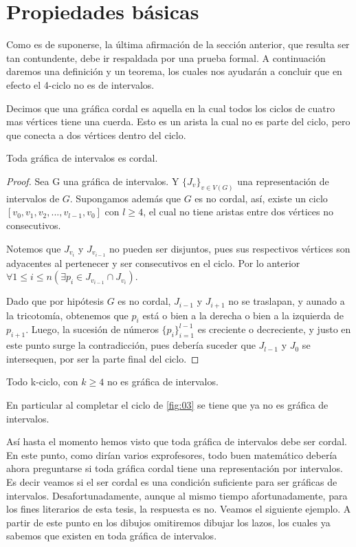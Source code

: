 \section{Propiedades b\'asicas}

Como es de suponerse, la última afirmación de la secci\'on anterior, que resulta ser tan contundente, debe ir respaldada por una prueba formal. 
A continuación daremos una definición y un teorema, los cuales nos ayudarán a concluir que en efecto el 4-ciclo no es de intervalos.

Decimos que una gráfica cordal es aquella en la cual todos los ciclos de cuatro mas vértices tiene una cuerda. Esto es un arista la cual no es parte del ciclo, pero que conecta a dos vértices dentro del ciclo.

\begin{teorema}
\label{teo:Int-Chord}
    Toda gráfica de intervalos es cordal.
\end{teorema}

\begin{proof}
    Sea G una gráfica de intervalos. Y $\{ J_v \}_{v \in V(G)}$ una representación de intervalos de $G$.
    Supongamos además que $G$ es no cordal, así, existe un ciclo $[v_0,v_1,v_2,...,v_{l-1},v_0]$ con $l \geq 4$, el cual no tiene aristas entre dos vértices no consecutivos.
    
    Notemos que $J_{v_i}$ y $J_{v_{i-1}}$ no pueden ser disjuntos, pues sus respectivos vértices son adyacentes al pertenecer y ser consecutivos en el ciclo. Por lo anterior $\forall 1 \leq i \leq n  (\exists p_i \in J_{v_{i-1}}\cap J_{v_i})$.
    
    Dado que por hipótesis $G$ es no cordal, $J_{i-1}$ y $J_{i+1}$ no se traslapan, y aunado a la tricotomía, obtenemos que $p_i$ está o bien a la derecha o bien a la izquierda de $p_{i+1}$.
    Luego, la sucesión de números $\{ p_i \}_{i=1}^{l-1}$ es creciente o decreciente, y justo en este punto surge la contradicción, pues debería suceder que $J_{l-1}$ y $J_0$ se intersequen, por ser la parte final del ciclo.
\end{proof}

\begin{corolario}
    Todo k-ciclo, con $k \geq 4$ no es gráfica de intervalos. 
\end{corolario}

En particular al completar el ciclo de \cref{fig:03} se tiene que ya no es gráfica de intervalos.

Así hasta el momento hemos visto que toda gráfica de intervalos debe ser cordal. En este punto, como dirían varios exprofesores, todo buen matemático debería ahora preguntarse si toda gráfica cordal tiene una representación por intervalos. Es decir veamos si el ser cordal es una condición suficiente para ser gráficas de intervalos.
Desafortunadamente, aunque al mismo tiempo afortunadamente, para los fines literarios de esta tesis, la respuesta es no.
Veamos el siguiente ejemplo. A partir de este punto en los dibujos omitiremos dibujar los lazos, los cuales ya sabemos que existen en toda gráfica de intervalos.


